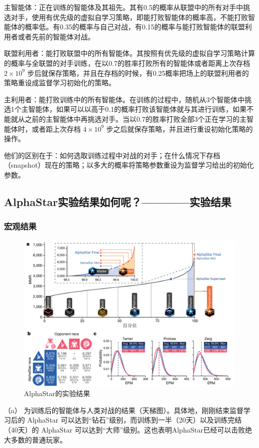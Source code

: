     主智能体：正在训练的智能体及其祖先。其有0.5的概率从联盟中的所有对手中挑选对手，使用有优先级的虚拟自学习策略，即能打败智能体的概率高，不能打败智能体的概率低。有0.35的概率与自己对战，有0.15的概率与能打败智能体的联盟利用者或者先前的智能体对战。

    联盟利用者：能打败联盟中的所有智能体。其按照有优先级的虚拟自学习策略计算的概率与全联盟的对手训练，在以0.7的胜率打败所有的智能体或者距离上次存档 $2 \times10^9$ 步后就保存策略，并且在存档的时候，有0.25概率把场上的联盟利用者的策略重设成监督学习初始化的策略。

    主利用者：能打败训练中的所有智能体。在训练的过程中，随机从3个智能体中挑选1个主智能体，如果可以以高于0.1的概率打败该智能体就与其进行训练，如果不能就从之前的主智能体中再挑选对手。当以0.7的胜率打败全部3个正在学习的主智能体时，或者距上次存档 $4 \times10^9 $ 步之后就保存策略，并且进行重设初始化策略的操作。

他们的区别在于：如何选取训练过程中对战的对手；在什么情况下存档（snapshot）现在的策略；以多大的概率将策略参数重设为监督学习给出的初始化参数。

\subsection{AlphaStar实验结果如何呢？————实验结果} 

\subsubsection{宏观结果} 

\begin{figure}[htb]
    \centering
    \includegraphics[width=0.5\linewidth]{res/ch13/13.7}
    \caption{AlphaStar的实验结果}
    \label{fig:13_7}
\end{figure}

（a） 为训练后的智能体与人类对战的结果（天梯图）。具体地，刚刚结束监督学习后的 AlphaStar 可以达到“钻石”级别，而训练到一半（20天）以及训练完结（40天）的 AlphaStar 可以达到“大师”级别。这也表明AlphaStar已经可以击败绝大多数的普通玩家。

